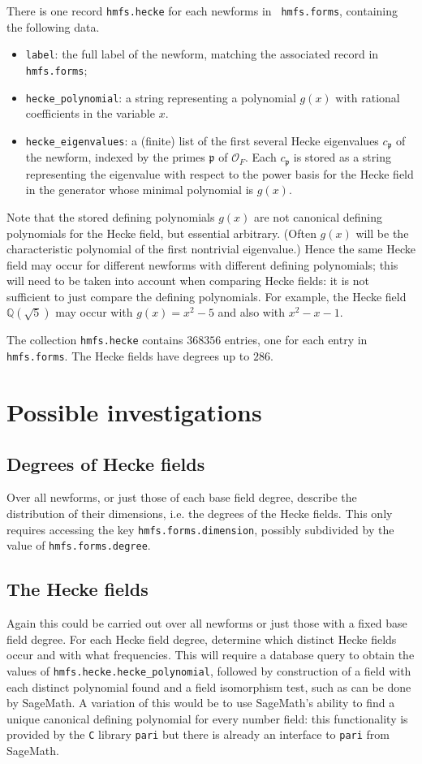 \documentclass{llncs}
\def\Q{{\mathbb Q}}
\def\O{{\mathcal{O}}}
\def\p{{\mathfrak{p}}}
\begin{document}
There is one record {\tt hmfs.hecke} for each newforms in {\tt
  hmfs.forms}, containing the following data.
\begin{itemize}
\item {\tt label}: the full label of the newform, matching the
  associated record in {\tt hmfs.forms};
\item {\tt hecke\_polynomial}: a string representing a polynomial
  $g(x)$ with rational coefficients in the variable $x$.
\item {\tt hecke\_eigenvalues}: a (finite) list of the first several
  Hecke eigenvalues $c_{\p}$ of the newform, indexed by the primes
  $\p$ of $\O_F$. Each $c_{\p}$ is stored as a string representing the
  eigenvalue with respect to the power basis for the Hecke field in
  the generator whose minimal polynomial is $g(x)$.
\end{itemize}
Note that the stored defining polynomials $g(x)$ are not canonical
defining polynomials for the Hecke field, but essential arbitrary.
(Often $g(x)$ will be the characteristic polynomial of the first
nontrivial eigenvalue.)  Hence the same Hecke field may occur for
different newforms with different defining polynomials; this will need
to be taken into account when comparing Hecke fields: it is not
sufficient to just compare the defining polynomials.  For example, the
Hecke field $\Q(\sqrt{5})$ may occur with $g(x)=x^2-5$ and also with
$x^2-x-1$.

The collection {\tt hmfs.hecke} contains $368356$ entries, one for
each entry in {\tt hmfs.forms}.  The Hecke fields have degrees up to $286$.

\section{Possible investigations}
\subsection{Degrees of Hecke fields} Over all newforms, or just those
of each base field degree, describe the distribution of their
dimensions, i.e. the degrees of the Hecke fields.  This only requires
accessing the key {\tt hmfs.forms.dimension}, possibly subdivided by
the value of  {\tt hmfs.forms.degree}.

\subsection{The Hecke fields} Again this could be carried out over all
newforms or just those with a fixed base field degree.  For each Hecke
field degree, determine which distinct Hecke fields occur and with
what frequencies.  This will require a database query to obtain the
values of {\tt hmfs.hecke.hecke\_polynomial}, followed by construction
of a field with each distinct polynomial found and a field isomorphism
test, such as can be done by SageMath.  A variation of this would be
to use SageMath's ability to find a unique canonical defining
polynomial for every number field: this functionality is provided by
the {\tt C} library {\tt pari} but there is already an interface to
{\tt pari} from SageMath.
\end{document}
